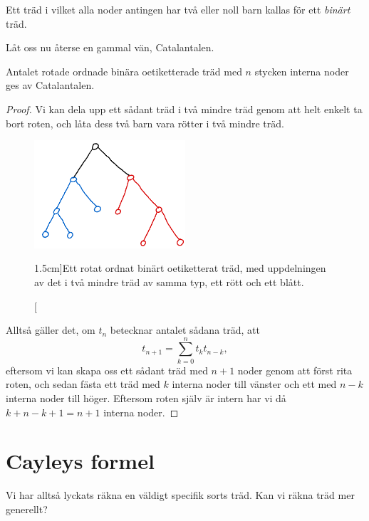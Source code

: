 \documentclass[nobib]{tufte-handout}
\begin{document}
\begin{definition}
    Ett träd i vilket alla noder antingen har två eller noll barn kallas för ett \emph{binärt} träd.
\end{definition}

Låt oss nu återse en gammal vän, Catalantalen.

\begin{proposition}
    Antalet rotade ordnade binära oetiketterade träd med $n$ stycken interna noder ges av Catalantalen.

    \begin{proof}
        Vi kan dela upp ett sådant träd i två mindre träd genom att helt enkelt ta bort roten, och låta dess två barn vara rötter i två mindre träd.

        \begin{figure}
            \centering
            \includegraphics[width=0.5\textwidth]{graphics/RUBOTree_division.png}
            \caption[][1.5cm]{Ett rotat ordnat binärt oetiketterat träd, med uppdelningen av det i två mindre träd av samma typ, ett rött och ett blått.}
        \end{figure}

        Alltså gäller det, om $t_n$ betecknar antalet sådana träd, att
        $$t_{n+1} = \sum_{k=0}^{n} t_k t_{n-k},$$
        eftersom vi kan skapa oss ett sådant träd med $n+1$ noder genom att först rita roten, och sedan fästa ett träd med $k$ interna noder till vänster och ett med $n-k$ interna noder till höger. Eftersom roten själv är intern har vi då $k + n - k + 1 = n + 1$ interna noder.
    \end{proof}
\end{proposition}

\section{Cayleys formel}

Vi har alltså lyckats räkna en väldigt specifik sorts träd. Kan vi räkna träd mer generellt?
\end{document}
